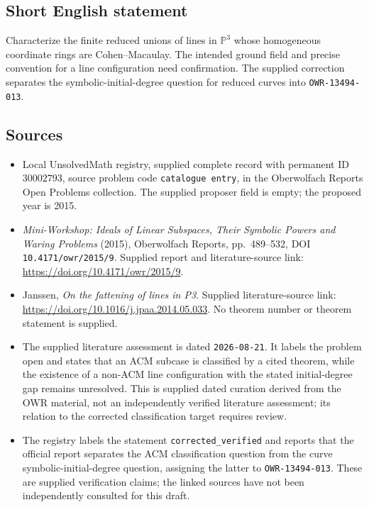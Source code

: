 \documentclass[11pt]{article}
\begin{document}
\subsection{Short English statement}
Characterize the finite reduced unions of lines in \(\mathbb P^3\) whose homogeneous coordinate rings are Cohen--Macaulay. The intended ground field and precise convention for a line configuration need confirmation. The supplied correction separates the symbolic-initial-degree question for reduced curves into \texttt{OWR-13494-013}.
\subsection{Sources}
\begin{itemize}
\item Local UnsolvedMath registry, supplied complete record with permanent ID \(30002793\), source problem code \texttt{catalogue entry}, in the Oberwolfach Reports Open Problems collection. The supplied proposer field is empty; the proposed year is 2015.
\item \emph{Mini-Workshop: Ideals of Linear Subspaces, Their Symbolic Powers and Waring Problems} (2015), Oberwolfach Reports, pp.~489--532, DOI \texttt{10.4171/owr/2015/9}. Supplied report and literature-source link: \url{https://doi.org/10.4171/owr/2015/9}.
\item Janssen, \emph{On the fattening of lines in P3}. Supplied literature-source link: \url{https://doi.org/10.1016/j.jpaa.2014.05.033}. No theorem number or theorem statement is supplied.
\item The supplied literature assessment is dated \texttt{2026-08-21}. It labels the problem open and states that an ACM subcase is classified by a cited theorem, while the existence of a non-ACM line configuration with the stated initial-degree gap remains unresolved. This is supplied dated curation derived from the OWR material, not an independently verified literature assessment; its relation to the corrected classification target requires review.
\item The registry labels the statement \texttt{corrected\_verified} and reports that the official report separates the ACM classification question from the curve symbolic-initial-degree question, assigning the latter to \texttt{OWR-13494-013}. These are supplied verification claims; the linked sources have not been independently consulted for this draft.
\end{itemize}
\end{document}
